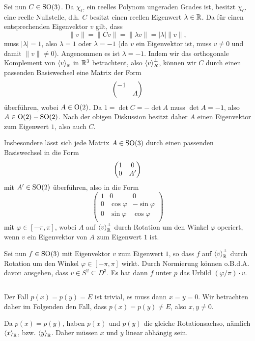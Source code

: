 \documentclass[a4paper,10pt]{article}
\begin{document}
Sei nun $C \in \operatorname{SO}(3)$. Da $\chi_C$ ein reelles Polynom ungeraden Grades ist, besitzt $\chi_C$ eine reelle Nullstelle, d.h. $C$ besitzt einen reellen Eigenwert $\lambda \in \mathbb{R}$. Da für einen entsprechenden Eigenvektor $v$ gilt, dass
\[
 \|v\| = \|Cv\| = \|\lambda v \| = |\lambda| \|v\|,
\]
muss $|\lambda| = 1$, also $\lambda = 1$ oder $\lambda = -1$ (da $v$ ein Eigenvektor ist, muss $v \neq 0$ und damit $\|v\| \neq 0$). Angenommen es ist $\lambda = -1$. Indem wir das orthogonale Komplement von $\left\langle v \right\rangle_{\mathbb{R}}$ in $\mathbb{R}^3$ betrachtent, also $\left\langle v \right\rangle_R^\perp$, können wir $C$ durch einen passenden Basiswechsel eine Matrix der Form
\[
 \begin{pmatrix}-1 & \\ & A\end{pmatrix}
\]
überführen, wobei $A \in \operatorname{O}(2)$. Da $1 = \det C = -\det A$ muss $\det A = -1$, also $A \in \operatorname{O}(2) - \operatorname{SO}(2)$. Nach der obigen Diskussion besitzt daher $A$ einen Eigenvektor zum Eigenwert $1$, also auch $C$.

Insbesondere lässt sich jede Matrix $A \in \operatorname{SO}(3)$ durch einen passenden Basiswechsel in die Form
\[
 \begin{pmatrix}1 & 0 \\ 0 & A'\end{pmatrix}
\]
mit $A' \in \operatorname{SO}(2)$ überführen, also in die Form
\[
 \begin{pmatrix}
  1 &            0 &             0 \\
  0 & \cos \varphi & -\sin \varphi \\
  0 & \sin \varphi &  \cos \varphi \\
 \end{pmatrix}
\]
mit $\varphi \in [-\pi,\pi]$, wobei $A$ auf $\left\langle v \right\rangle_{\mathbb{R}}^\perp$ durch Rotation um den Winkel $\varphi$ operiert, wenn $v$ ein Eigenvektor von $A$ zum Eigenwert $1$ ist.

Sei nun $f \in \operatorname{SO}(3)$ mit Eigenvektor $v$ zum Eigenwert $1$, so dass $f$ auf $\left\langle v \right\rangle_{\mathbb{R}}^\perp$ durch Rotation um den Winkel $\varphi \in [-\pi,\pi]$ wirkt. Durch Normierung können o.B.d.A. davon ausgehen, dass $v \in S^2 \subseteq D^3$. Es hat dann $f$ unter $p$ das Urbild $(\varphi/\pi) \cdot v$.


\addtocounter{subsection}{1}
\subsection{}
Der Fall $p(x) = p(y) = E$ ist trivial, es muss dann $x = y = 0$. Wir betrachten daher im Folgenden den Fall, dass $p(x) = p(y) \neq E$, also $x,y \neq 0$.

Da $p(x) = p(y)$, haben $p(x)$ und $p(y)$ die gleiche Rotationsachso, nämlich $\left\langle x \right\rangle_{\mathbb{R}}$, bzw. $\left\langle y \right\rangle_{\mathbb{R}}$. Daher müssen $x$ und $y$ linear abhängig sein.
\end{document}
